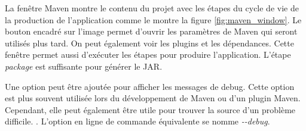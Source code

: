 La fenêtre Maven montre le contenu du projet avec les étapes du cycle de vie de la production de l'application comme le montre la figure \ref{fig:maven_window}. Le bouton encadré sur l'image permet d'ouvrir les paramètres de Maven qui seront utilisés plus tard. On peut également voir les plugins et les dépendances. Cette fenêtre permet aussi d'exécuter les étapes pour produire l'application. L'étape \textit{package} est suffisante pour générer le JAR.

\begin{minipage}{\linewidth}
\label{fig:maven_window}
\end{minipage}

Une option peut être ajoutée pour afficher les messages de debug. Cette option est plus souvent utilisée lors du développement de Maven ou d'un plugin Maven. Cependant, elle peut également être utile pour trouver la source d'un problème difficile. . L'option en ligne de commande équivalente se nomme \textit{-{}-debug}.